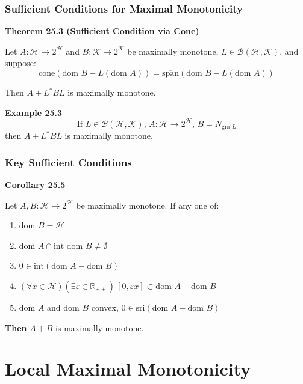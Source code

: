 \documentclass[aspectratio=169,10pt]{beamer}
\begin{document}
\begin{frame}
  \frametitle{Sufficient Conditions for Maximal Monotonicity}

  \textbf{Theorem 25.3 (Sufficient Condition via Cone)}

  Let $A: \mathcal{H} \to 2^{\mathcal{H}}$ and $B: \mathcal{K} \to 2^{\mathcal{K}}$ be maximally monotone,
  $L \in \mathcal{B}(\mathcal{H}, \mathcal{K})$, and suppose:
  $$\text{cone}(\text{dom } B - L(\text{dom } A)) = \overline{\text{span}}(\text{dom } B - L(\text{dom } A))$$

  Then $A + L^* B L$ is maximally monotone.

  \vspace{0.3cm}

  \textbf{Example 25.3}
  $$\text{If } L \in \mathcal{B}(\mathcal{H}, \mathcal{K}), \, A: \mathcal{H} \to 2^{\mathcal{H}}, \, B = N_{\text{gra } L}$$
  then $A + L^* BL$ is maximally monotone.

\end{frame}

\begin{frame}
  \frametitle{Key Sufficient Conditions}

  \textbf{Corollary 25.5}

  Let $A, B: \mathcal{H} \to 2^{\mathcal{H}}$ be maximally monotone. If any one of:

  \begin{enumerate}
    \item[(i)] $\text{dom } B = \mathcal{H}$
    \item[(ii)] $\text{dom } A \cap \text{int } \text{dom } B \neq \emptyset$
    \item[(iii)] $0 \in \text{int}(\text{dom } A - \text{dom } B)$
    \item[(iv)] $(\forall x \in \mathcal{H})(\exists \varepsilon \in \mathbb{R}_{++}) \, [0, \varepsilon x] \subset \text{dom } A - \text{dom } B$
    \item[(v)] $\text{dom } A$ and $\text{dom } B$ convex, $0 \in \text{sri}(\text{dom } A - \text{dom } B)$
  \end{enumerate}

  \textbf{Then } $A + B$ is maximally monotone.

\end{frame}

\section{Local Maximal Monotonicity}
\end{document}
